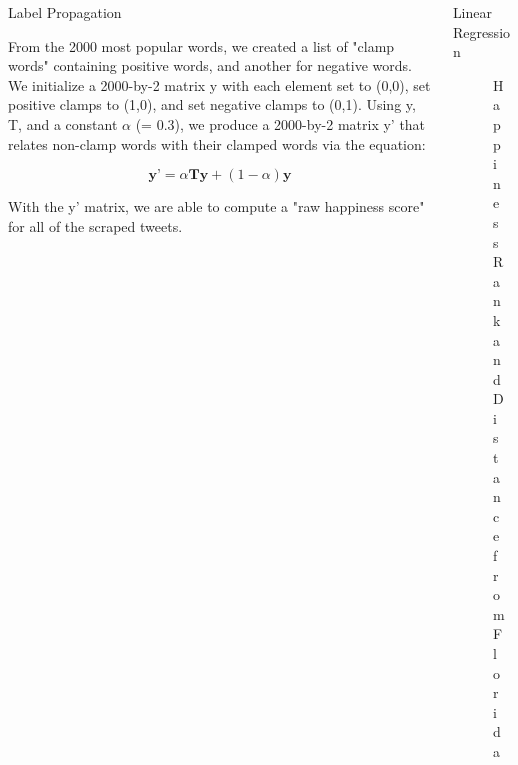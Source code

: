 \documentclass[final]{beamer}
\newlength{\onecolwid}
\newlength{\twocolwid}
\begin{document}
\begin{frame}[t]
\begin{columns}[t]
\begin{column}{\twocolwid}
\begin{columns}[t,totalwidth=\twocolwid]
\begin{column}{\onecolwid}
\begin{block}{Label Propagation}
{From the 2000 most popular words, we created a list of "clamp words" containing positive words, and another for negative words.  We initialize a 2000-by-2 matrix y with each element set to (0,0), set positive clamps to (1,0), and set negative clamps to (0,1). Using y, T, and a constant $\alpha$ (= 0.3), we produce a 2000-by-2 matrix y' that relates non-clamp words with their clamped words via the equation:

\begin{equation}
\textbf{y'} = \alpha \textbf{Ty} + (1-\alpha)\textbf{y}
\end{equation}

With the y' matrix, we are able to compute a "raw happiness score" for all of the scraped tweets.
}
\end{block}




\end{column} %

\begin{column}{\onecolwid}\vspace{-.6in} %




\begin{block}{Linear Regression}
\begin{figure}[h]
\caption{Happiness Rank and Distance from Florida}
\end{figure}




\end{block}
\end{column}
\end{columns}
\end{column}
\end{columns}
\end{frame}
\end{document}
